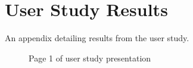 \chapter{User Study Results} \label{App:User Study Results}

\begin{preamble}
	An appendix detailing results from the user study.
\end{preamble}

\begin{landscape}

\begin{figure}[h]
\begin{center}
	\vspace{-10pt}
\end{center}
\caption{\label{Figure:User study presentation page 1} Page 1 of user study presentation}
\end{figure}


\end{landscape}
